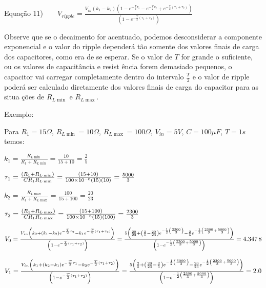 \documentclass{article}
\begin{document}
Equa\c{c}\~{a}o 11)$\qquad V_{ripple}=\frac{V_{in}\left( k_{1}-k_{2}\right)
\left( 1-e^{-\frac{T}{2}\tau _{1}}-e^{-\frac{T}{2}\tau _{2}}+e^{-\frac{T}{2}%
\left( \tau _{1}+\tau _{2}\right) }\right) }{\left( 1-e^{-\frac{T}{2}\left(
\tau _{1}+\tau _{2}\right) }\right) }$

\vspace{1pt}

Observe que se o decaimento for acentuado, podemos desconsiderar a
componente exponencial e o valor do ripple depender\'{a} t\~{a}o somente dos
valores finais de carga dos capacitores, como era de se esperar. Se o valor
de $T$ for grande o suficiente, ou os valores de capacit\^{a}ncia e resist%
\^{e}ncia forem demasiado pequenos, o capacitor vai carregar completamente
dentro do intervalo $\frac{T}{2}$ e o valor de ripple poder\'{a} ser
calculado diretamente dos valores finais de carga do capacitor para as situa%
\c{c}\~{o}es de $R_{L\min }$ e $R_{L\max }$.

\vspace{1pt}Exemplo:

Para $R_{1}=15\Omega $, $R_{L\min }=10\Omega $, $R_{L\max }=100\Omega $, $%
V_{in}=5V$, $C=100\mu F$, $T=1s$ temos:

$k_{1}=\frac{R_{L\min }}{R_{1}+R_{L\min }}=\frac{10}{15+10}=\allowbreak 
\frac{2}{5}$

$\tau _{1}=\frac{\left( R_{1}+R_{L\min }\right) }{CR_{1}R_{L\min }}=\frac{%
\left( 15+10\right) }{100\times 10^{-6}\left( 15\right) \left( 10\right) }%
=\allowbreak \frac{5000}{3}$

$k_{2}=\frac{R_{L\max }}{R_{1}+R_{L\max }}=\frac{100}{15+100}=\allowbreak 
\frac{20}{23}$

$\tau _{2}=\frac{\left( R_{1}+R_{L\max }\right) }{CR_{1}R_{L\max }}=\frac{%
\left( 15+100\right) }{100\times 10^{-6}\left( 15\right) \left( 100\right) }%
=\allowbreak \frac{2300}{3}$

$V_{0}=\frac{V_{in}\left( k_{2}+\left( k_{1}-k_{2}\right) e^{-\frac{T}{2}%
\tau _{2}}-k_{1}e^{-\frac{T}{2}\left( \tau _{1}+\tau _{2}\right) }\right) }{%
\left( 1-e^{-\frac{T}{2}\left( \tau _{1}+\tau _{2}\right) }\right) }=\frac{%
5\left( \frac{20}{23}+\left( \frac{2}{5}-\frac{20}{23}\right) e^{-\frac{1}{2}%
\left( \frac{2300}{3}\right) }-\frac{2}{5}e^{-\frac{1}{2}\left( \frac{2300}{3%
}+\frac{5000}{3}\right) }\right) }{\left( 1-e^{-\frac{1}{2}\left( \frac{2300%
}{3}+\frac{5000}{3}\right) }\right) }=\allowbreak 4.\allowbreak 347\,8$

$V_{1}=\frac{V_{in}\left( k_{1}+\left( k_{2}-k_{1}\right) e^{-\frac{T}{2}%
\tau _{1}}-k_{2}e^{-\frac{T}{2}\left( \tau _{1}+\tau _{2}\right) }\right) }{%
\left( 1-e^{-\frac{T}{2}\left( \tau _{1}+\tau _{2}\right) }\right) }=\frac{%
5\left( \frac{2}{5}+\left( \frac{20}{23}-\frac{2}{5}\right) e^{-\frac{1}{2}%
\left( \frac{5000}{3}\right) }-\frac{20}{23}e^{-\frac{1}{2}\left( \frac{2300%
}{3}+\frac{5000}{3}\right) }\right) }{\left( 1-e^{-\frac{1}{2}\left( \frac{%
2300}{3}+\frac{5000}{3}\right) }\right) }=\allowbreak 2.0$
\end{document}

